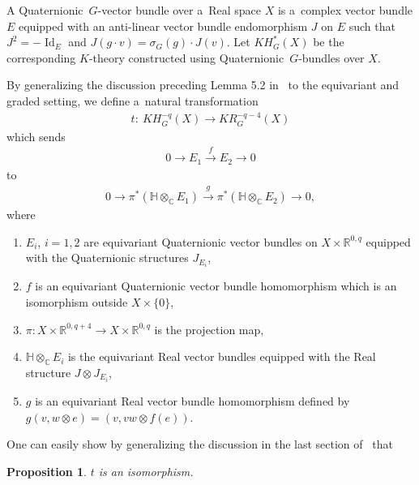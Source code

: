 \documentclass[11pt]{article}
\numberwithin{equation}{section}
\newtheorem{Proposition}[Theorem]{Proposition}
{\theoremstyle{definition}
\newtheorem{Definition}[Theorem]{Definition}
\newtheorem{Example}[Theorem]{Example}
\newtheorem{Remark}[Theorem]{Remark}
}
\DeclareMathOperator{\Id}{Id}
\begin{document}
\begin{Definition}
A Quaternionic~$G$-vector bundle over a~Real space $X$ is a~complex vector bundle $E$ equipped with an anti-linear
vector bundle endomorphism $J$ on $E$ such that $J^2=-\Id_E$ and $J(g\cdot v)=
\sigma_G(g)\cdot J(v)$.
Let $KH^*_G(X)$ be the corresponding $K$-theory constructed using Quaternionic~$G$-bundles over $X$.
\end{Definition}
By generalizing the discussion preceding Lemma 5.2 in~\cite{Se} to the equivariant and graded setting, we def\/ine
a~natural transformation
\begin{gather*}
t: \ KH_G^{-q}(X)\to KR^{-q-4}_G(X)
\end{gather*}
which sends
\begin{gather*}
0\longrightarrow E_1
\stackrel{f}
{\longrightarrow} E_2\longrightarrow 0
\end{gather*}
to
\begin{gather*}
0\longrightarrow \pi^*(\mathbb{H}\otimes_\mathbb{C} E_1)\stackrel{g}
{\longrightarrow}\pi^*(\mathbb{H}\otimes_\mathbb{C}E_2)\longrightarrow 0,
\end{gather*}
where
\begin{enumerate}\itemsep=0pt
\item[1)]
$E_i$, $i=1, 2$ are equivariant Quaternionic vector bundles on $X\times\mathbb{R}^{0, q}$ equipped with the Quaternionic
structures $J_{E_i}$,
\item[2)]
$f$ is an equivariant Quaternionic vector bundle homomorphism which is an isomorphism outside $X\times\{0\}$,
\item[3)]
$\pi: X\times\mathbb{R}^{0, q+4}\to X\times\mathbb{R}^{0, q}$ is the projection map,
\item[4)]
$\mathbb{H}\otimes_\mathbb{C}E_i$ is the equivariant Real vector bundles equipped with the Real structure $J\otimes J_{E_i}$,
\item[5)]
$g$ is an equivariant Real vector bundle homomorphism def\/ined by $g(v, w\otimes e)=(v, vw\otimes f(e))$.
\end{enumerate}

One can easily show by generalizing the discussion in the last section of~\cite{AS} that
\begin{Proposition}
\label{shiftbyfour}
$t$ is an isomorphism.
\end{Proposition}
\end{document}
